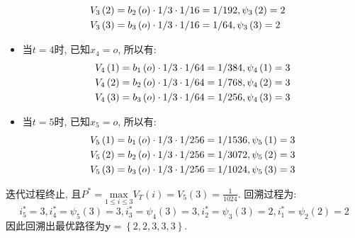 \documentclass{article}
\begin{document}
\begin{homeworkProblem}
\begin{itemize}
\begin{align}
			\\
			V_3\left( 2 \right) &=b_2\left( o \right) \cdot 1/3\cdot 1/16=1/192,\psi _3\left( 2 \right) =2 \notag
			\\
			V_3\left( 3 \right) &=b_3\left( o \right) \cdot 1/3\cdot 1/16=1/64,\psi _3\left( 3 \right) =2 \notag
		\end{align}
		\item 当$t=4$时, 已知$x_4=o$, 所以有:
		\begin{align}
			V_4\left( 1 \right) &=b_1\left( o \right) \cdot 1/3\cdot 1/64=1/384,\psi _4\left( 1 \right) =3 \notag
			\\
			V_4\left( 2 \right) &=b_2\left( o \right) \cdot 1/3\cdot 1/64=1/768,\psi _4\left( 2 \right) =3 \notag
			\\
			V_4\left( 3 \right) &=b_3\left( o \right) \cdot 1/3\cdot 1/64=1/256,\psi _4\left( 3 \right) =3 \notag
		\end{align}
		\item 当$t=5$时, 已知$x_5=o$, 所以有:
		\begin{align}
			V_5\left( 1 \right) &=b_1\left( o \right) \cdot 1/3\cdot 1/256=1/1536,\psi _5\left( 1 \right) =3 \notag
			\\
			V_5\left( 2 \right) &=b_2\left( o \right) \cdot 1/3\cdot 1/256=1/3072,\psi _5\left( 2 \right) =3 \notag
			\\
			V_5\left( 3 \right) &=b_3\left( o \right) \cdot 1/3\cdot 1/256=1/1024,\psi _5\left( 3 \right) =3 \notag
		\end{align}
	\end{itemize}
	迭代过程终止, 且$\displaystyle P^{\ast}=\underset{1\le i\le 3}{\text{max}}V_{T}(i)=V_{5}(3)=\frac{1}{1024}$. 回溯过程为:$$i_{5}^{\ast}=3,i_{4}^{\ast}=\psi _5\left( 3 \right) =3,i_{3}^{\ast}=\psi _4\left( 3 \right) =3,i_{2}^{\ast}=\psi _3\left( 3 \right) =2,i_{1}^{\ast}=\psi _2\left( 2 \right) =2
	$$
	因此回溯出最优路径为$\boldsymbol{y}=\left\{ 2,2,3,3,3 \right\}$.
\end{homeworkProblem}
\newpage
\end{document}
